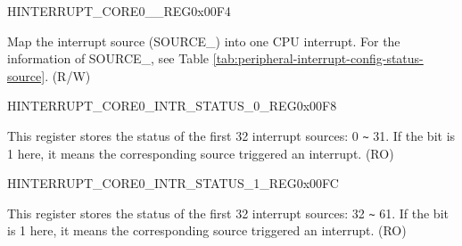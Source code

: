 \begin{register}{H}{INTERRUPT\_CORE0\_\_REG}{0x00F4}\label{regdesc:INTERRUPTCORE0CACHECORE0ACSINTMAPREG}
%
%
\regnewline%
\begin{regdesc}\begin{reglist}
\label{fielddesc:INTERRUPTCORE0CACHECORE0ACSINTMAP}\item [INTERRUPT\_CORE0\_SOURCE\_\regindex{X}\_MAP] Map the interrupt source (SOURCE\_) into one CPU interrupt. For the information of SOURCE\_, see Table \ref{tab:peripheral-interrupt-config-status-source}. (R/W)
\end{reglist}\end{regdesc}
\end{register}


\begin{register}{H}{INTERRUPT\_CORE0\_INTR\_STATUS\_0\_REG}{0x00F8}\label{regdesc:INTERRUPTCORE0INTRSTATUS0REG}
%
\regnewline%
\begin{regdesc}\begin{reglist}
\label{fielddesc:INTERRUPTCORE0INTRSTATUS0}\item [INTERRUPT\_CORE0\_INTR\_STATUS\_0] This register stores the status of the first 32 interrupt sources: 0 \verb+~+ 31. If the bit is 1 here, it means the corresponding source triggered an interrupt. (RO)
\end{reglist}\end{regdesc}
\end{register}


\begin{register}{H}{INTERRUPT\_CORE0\_INTR\_STATUS\_1\_REG}{0x00FC}\label{regdesc:INTERRUPTCORE0INTRSTATUS1REG}
%
\regnewline%
\begin{regdesc}\begin{reglist}
\label{fielddesc:INTERRUPTCORE0INTRSTATUS1}\item [INTERRUPT\_CORE0\_INTR\_STATUS\_1] This register stores the status of the first 32 interrupt sources: 32 \verb+~+ 61. If the bit is 1 here, it means the corresponding source triggered an interrupt. (RO)
\end{reglist}\end{regdesc}
\end{register}


